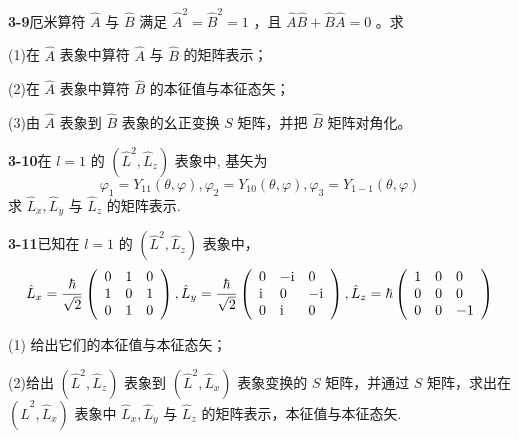 \vfill

\newpage

\textbf{3-9}\quad 厄米算符 $\displaystyle \hat{A}$ 与 $\displaystyle \hat{B}$ 满足 $\displaystyle \hat{A}^2 = \hat{B}^2 = 1$ ，且 $\displaystyle \hat{A}\hat{B} + \hat{B}\hat{A} = 0$ 。求

(1)在 $\displaystyle \hat{A}$ 表象中算符 $\displaystyle \hat{A}$ 与 $\displaystyle \hat{B}$ 的矩阵表示；

(2)在 $\displaystyle \hat{A}$ 表象中算符 $\displaystyle \hat{B}$ 的本征值与本征态矢；

(3)由 $\displaystyle \hat{A}$ 表象到 $\displaystyle \hat{B}$ 表象的幺正变换 $\displaystyle S$ 矩阵，并把 $\displaystyle \hat{B}$ 矩阵对角化。

\vfill

\newpage

\textbf{3-10}\quad 在 $\displaystyle l = 1$ 的 $\displaystyle (\hat{L}^2, \hat{L}_z)$ 表象中, 基矢为
$$
\varphi_ {1} = Y _ {1 1} (\theta , \varphi), \varphi_ {2} = Y _ {1 0} (\theta , \varphi), \varphi_ {3} = Y _ {1 - 1} (\theta , \varphi)
$$
求 $\displaystyle \hat{L}_x, \hat{L}_y$ 与 $\displaystyle \hat{L}_z$ 的矩阵表示.

\vfill

\newpage

\textbf{3-11}\quad 已知在 $\displaystyle l = 1$ 的 $\displaystyle \left(\hat{L}^2, \hat{L}_z\right)$ 表象中，
$$
\hat {L} _ {x} = \dfrac {\hbar}{\sqrt {2}} \left( \begin{array}{l l l} 0 & 1 & 0 \\ 1 & 0 & 1 \\ 0 & 1 & 0 \end{array} \right), \hat {L} _ {y} = \dfrac {\hbar}{\sqrt {2}} \left( \begin{array}{l l l} 0 & - \mathrm{i} & 0 \\ \mathrm{i} & 0 & - \mathrm{i} \\ 0 & \mathrm{i} & 0 \end{array} \right), \hat {L} _ {z} = \hbar \left( \begin{array}{l l l} 1 & 0 & 0 \\ 0 & 0 & 0 \\ 0 & 0 & - 1 \end{array} \right)
$$

(1) 给出它们的本征值与本征态矢；

(2)给出 $\displaystyle (\hat{L}^2, \hat{L}_z)$ 表象到 $\displaystyle (\hat{L}^2, \hat{L}_x)$ 表象变换的 $\displaystyle S$ 矩阵，并通过 $\displaystyle S$ 矩阵，求出在 $\displaystyle (\hat{L}^2, \hat{L}_x)$ 表象中 $\displaystyle \hat{L}_x, \hat{L}_y$ 与 $\displaystyle \hat{L}_z$ 的矩阵表示，本征值与本征态矢.

